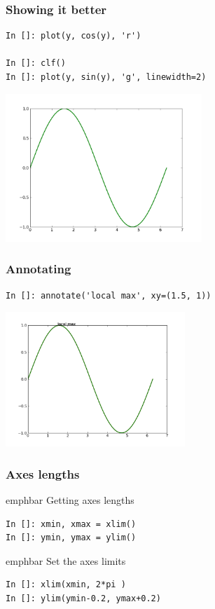 \documentclass[14pt,compress]{beamer}
\newcommand{\emphbar}[1]
{\begin{beamercolorbox}[rounded=true]{emphbar} 
      {#1}
 \end{beamercolorbox}
}
\newcounter{time}
\newcommand{\inctime}[1]{\addtocounter{time}{#1}{\tiny \thetime\ m}}
\begin{document}
\begin{frame}[fragile]
\frametitle{Showing it better}
\vspace{-0.15in}
\begin{lstlisting}
In []: plot(y, cos(y), 'r')

In []: clf()
In []: plot(y, sin(y), 'g', linewidth=2)
\end{lstlisting}
\vspace*{-0.2in}
\begin{center}
  \includegraphics[height=2.2in, interpolate=true]{data/green}  
\end{center}
\end{frame}

\begin{frame}[fragile]
\frametitle{Annotating}
\vspace*{-0.15in}
\begin{lstlisting}
In []: annotate('local max', xy=(1.5, 1))
\end{lstlisting}
\vspace*{-0.2in}
\begin{center}
  \includegraphics[height=2in, interpolate=true]{data/annotate}  
\end{center}
\end{frame}

\begin{frame}[fragile]
\frametitle{Axes lengths}
\emphbar{Getting axes lengths}
  \begin{lstlisting}
In []: xmin, xmax = xlim() 
In []: ymin, ymax = ylim() 
  \end{lstlisting}
\emphbar{Set the axes limits}
  \begin{lstlisting}
In []: xlim(xmin, 2*pi )
In []: ylim(ymin-0.2, ymax+0.2)
  \end{lstlisting}
\end{frame}
\end{document}
